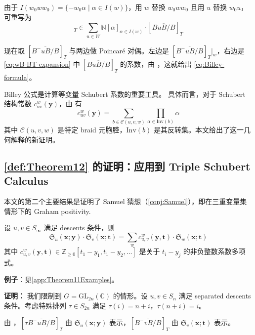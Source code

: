 由于 $I(w_0ww_0) = \{-w_0\alpha \mid \alpha \in I(w)\}$，用 $w$ 替换 $w_0ww_0$ 且用 $u$ 替换 $w_0u$，可重写为
\begin{equation}
[wB/B]_T \in \sum_{u \in W} \mathbb{N}[\alpha]_{\alpha \in I(w)} \cdot [\overline{BuB/B}]_T \label{eq:wB-BT-expansion}
\end{equation}

现在取 $[\overline{B^-uB/B}]_T$ 与两边做 Poincaré 对偶。左边是 $[\overline{B^-uB/B}]_T|_w$，右边是 \eqref{eq:wB-BT-expansion} 中 $[\overline{BuB/B}]_T$ 的系数，由 \cite[Proposition 7.3]{anderson2023}，这就给出 \eqref{eq:Billey-formula}。

Billey 公式是计算等变量 Schubert 系数的重要工具。 具体而言，对于 Schubert 结构常数 $c^w_{uv}(\mathbf{y})$，由 \cite[Corollary 4.3]{billey1999} 有
$$c^w_{uv}(\mathbf{y}) = \sum_{b \in \mathcal{C}(u,v,w)} \prod_{\alpha \in \text{Inv}(b)} \alpha$$
其中 $\mathcal{C}(u,v,w)$ 是特定 braid 元胞腔，$\text{Inv}(b)$ 是其反转集。本文给出了这一几何解释的新证明。

\subsection{\cref{def:Theorem12} 的证明：应用到 Triple Schubert Calculus}
\label{sec:TripleSchubertProof}

本文的第二个主要结果是证明了 Samuel 猜想（\cref{conj:Samuel}），即在三重变量集情形下的 Graham positivity.

\begin{Theorem}
\label{def:Theorem12}
设 $u, v \in S_\infty$ 满足 descents 条件，则
$$\mathfrak{S}_u(\mathbf{x}; \mathbf{y}) \cdot \mathfrak{S}_v(\mathbf{x}; \mathbf{t}) = \sum_w c^w_{u,v}(\mathbf{y}, \mathbf{t}) \cdot \mathfrak{S}_w(\mathbf{x}; \mathbf{t})$$
其中 $c^w_{u,v}(\mathbf{y}, \mathbf{t}) \in \mathbb{Z}_{\geq 0}[t_1-y_1, t_1-y_2, \ldots]$ 是关于 $t_i - y_j$ 的非负整数系数多项式。

\textbf{例子}：见\cref{app:Theorem11Examples}。
\end{Theorem}



\textbf{证明：} 我们限制到 $G = \mathrm{GL}_{2n}(\mathbb{C})$ 的情形。设 $u, v \in S_n$ 满足 separated descents 条件。考虑特殊排列 $\tau \in S_{2n}$ 满足 $\tau(i) = n + i$，$\tau(n + i) = i$。

由 \cite[Section 16.5]{anderson2023}，$[\tau\overline{B^-uB/B}]_T$ 由 $\mathfrak{S}_u(\mathbf{x}; \mathbf{y})$ 表示，$[\overline{B^-vB/B}]_T$ 由 $\mathfrak{S}_v(\mathbf{x}; \mathbf{t})$ 表示。

